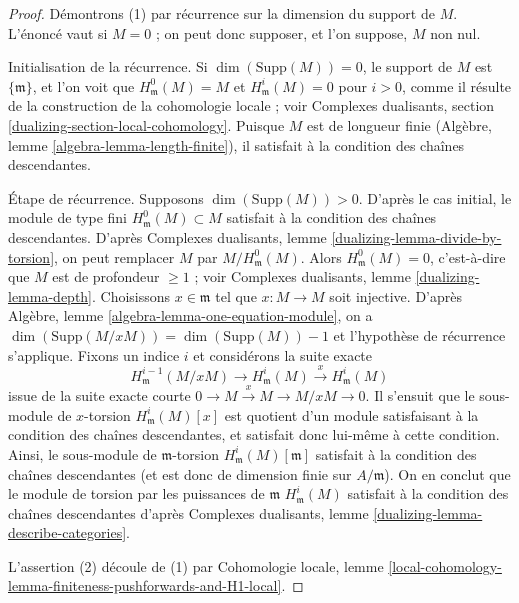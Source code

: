 \begin{proof}
Démontrons (1) par récurrence sur la dimension du support de $M$.
L'énoncé vaut si $M = 0$ ; on peut donc supposer, et l'on suppose, $M$ non nul.

\medskip\noindent
Initialisation de la récurrence.
Si $\dim(\text{Supp}(M)) = 0$, le support
de $M$ est $\{\mathfrak m\}$, et l'on voit que $H^0_\mathfrak m(M) = M$
et $H^i_\mathfrak m(M) = 0$ pour $i > 0$, comme il résulte de la
construction de la cohomologie locale ; voir
Complexes dualisants, section \ref{dualizing-section-local-cohomology}.
Puisque $M$ est de longueur finie (Algèbre, lemme \ref{algebra-lemma-length-finite}),
il satisfait à la condition des chaînes descendantes.

\medskip\noindent
Étape de récurrence. Supposons $\dim(\text{Supp}(M)) > 0$.
D'après le cas initial, le module de type fini $H^0_\mathfrak m(M) \subset M$
satisfait à la condition des chaînes descendantes.
D'après Complexes dualisants, lemme \ref{dualizing-lemma-divide-by-torsion},
on peut remplacer $M$ par $M/H^0_\mathfrak m(M)$.
Alors $H^0_\mathfrak m(M) = 0$, c'est-à-dire que $M$ est de profondeur $\geq 1$ ; voir
Complexes dualisants, lemme \ref{dualizing-lemma-depth}.
Choisissons $x \in \mathfrak m$ tel que $x : M \to M$ soit injective.
D'après Algèbre, lemme \ref{algebra-lemma-one-equation-module}, on a
$\dim(\text{Supp}(M/xM)) = \dim(\text{Supp}(M)) - 1$ et l'hypothèse
de récurrence s'applique. Fixons un indice $i$ et considérons la
suite exacte
$$
H^{i - 1}_\mathfrak m(M/xM) \to H^i_\mathfrak m(M) \xrightarrow{x}
H^i_\mathfrak m(M)
$$
issue de la suite exacte courte $0 \to M \xrightarrow{x} M \to M/xM \to 0$.
Il s'ensuit que le sous-module de $x$-torsion $H^i_\mathfrak m(M)[x]$
est quotient d'un module satisfaisant à la condition des chaînes descendantes,
et satisfait donc lui-même à cette condition. Ainsi, le sous-module
de $\mathfrak m$-torsion $H^i_\mathfrak m(M)[\mathfrak m]$ satisfait
à la condition des chaînes descendantes (et est donc de dimension finie
sur $A/\mathfrak m$). On en conclut que le module de torsion par les puissances de $\mathfrak m$
$H^i_\mathfrak m(M)$ satisfait à la condition des chaînes descendantes
d'après Complexes dualisants, lemme
\ref{dualizing-lemma-describe-categories}.

\medskip\noindent
L'assertion (2) découle de (1) par Cohomologie locale,
lemme \ref{local-cohomology-lemma-finiteness-pushforwards-and-H1-local}.
\end{proof}

